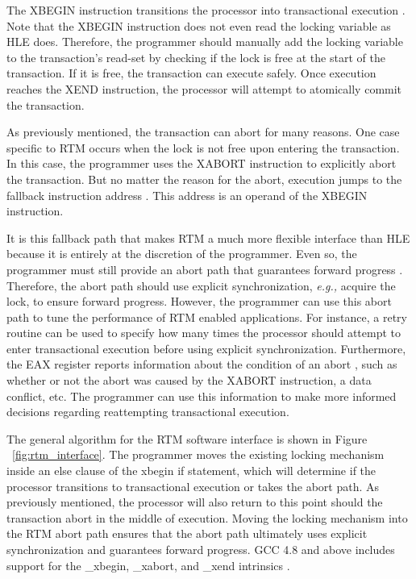 \documentclass[11pt]{book}
\begin{document}
The XBEGIN instruction transitions the processor into transactional execution
\cite{intel_prog_ref}.  Note that the XBEGIN instruction does not even read the locking
variable as HLE does.  Therefore, the programmer should manually add the locking variable
to the transaction's read-set by checking if the lock is free at the start of the
transaction.  If it is free, the transaction can execute safely.  Once execution reaches
the XEND instruction, the processor will attempt to atomically commit the transaction.

As previously mentioned, the transaction can abort for many reasons.  One case specific to
RTM occurs when the lock is not free upon entering the transaction.  In this case, the
programmer uses the XABORT instruction to explicitly abort the transaction.  But no matter
the reason for the abort, execution jumps to the fallback instruction address
\cite{intel_prog_ref}.  This address is an operand of the XBEGIN instruction.

It is this fallback path that makes RTM a much more flexible interface than HLE because it
is entirely at the discretion of the programmer.  Even so, the programmer must still
provide an abort path that guarantees forward progress \cite{intel_prog_ref}.  Therefore,
the abort path should use explicit synchronization, \emph{e.g.,} acquire the lock, to
ensure forward progress. However, the programmer can use this abort path to tune the
performance of RTM enabled applications.  For instance, a retry routine can be used to
specify how many times the processor should attempt to enter transactional execution
before using explicit synchronization.  Furthermore, the EAX register reports information
about the condition of an abort \cite{intel_prog_ref}, such as whether or not the abort
was caused by the XABORT instruction, a data conflict, etc.  The programmer can use this
information to make more informed decisions regarding reattempting transactional
execution.

The general algorithm for the RTM software interface is shown in Figure
~\ref{fig:rtm_interface}.  The programmer moves the existing locking mechanism inside an
else clause of the xbegin if statement, which will determine if the processor transitions
to transactional execution or takes the abort path.  As previously mentioned, the
processor will also return to this point should the transaction abort in the middle of
execution. Moving the locking mechanism into the RTM abort path ensures that the abort
path ultimately uses explicit synchronization and guarantees forward progress.  GCC 4.8
and above includes support for the \_xbegin, \_xabort, and \_xend intrinsics \cite{gcc}.
\end{document}

